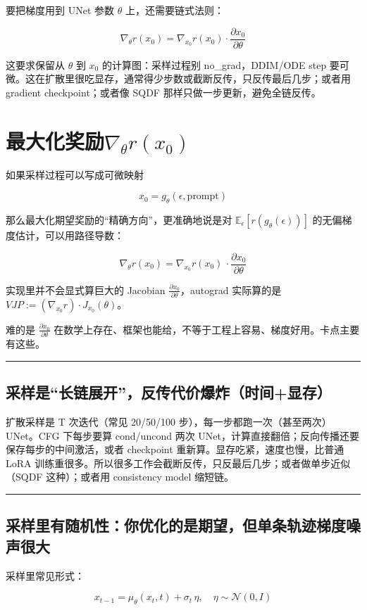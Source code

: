 要把梯度用到 UNet 参数 \(\theta\) 上，还需要链式法则：

\[
\nabla_\theta r(x_0)=\nabla_{x_0} r(x_0)\cdot \frac{\partial x_0}{\partial \theta}
\]

这要求保留从 \(\theta\) 到 \(x_0\) 的计算图：采样过程别 no\_grad，DDIM/ODE step 要可微。这在扩散里很吃显存，通常得少步数或截断反传，只反传最后几步；或者用 gradient checkpoint；或者像 SQDF 那样只做一步更新，避免全链反传。

\section{最大化奖励\(\nabla_\theta r(x_0)\)}

如果采样过程可以写成可微映射

\[
x_0 = g_\theta(\epsilon,\text{prompt})
\]

那么最大化期望奖励的“精确方向”，更准确地说是对 \(\mathbb{E}_\epsilon[r(g_\theta(\epsilon))]\) 的无偏梯度估计，可以用路径导数：

\[
\nabla_\theta r(x_0)=\nabla_{x_0} r(x_0)\,\cdot \frac{\partial x_0}{\partial \theta}
\]

实现里并不会显式算巨大的 Jacobian \(\frac{\partial x_0}{\partial\theta}\)，autograd 实际算的是 \(VJP := (\nabla_{x_0} r)\cdot J_{x_0}(\theta)\)。

难的是 \(\frac{\partial x_0}{\partial \theta}\) 在数学上存在、框架也能给，不等于工程上容易、梯度好用。卡点主要有这些。

\hrule

\subsection{采样是“长链展开”，反传代价爆炸（时间+显存）}

扩散采样是 T 次迭代（常见 20/50/100 步），每一步都跑一次（甚至两次）UNet。CFG 下每步要算 cond/uncond 两次 UNet，计算直接翻倍；反向传播还要保存每步的中间激活，或者 checkpoint 重新算。显存吃紧，速度也慢，比普通 LoRA 训练重很多。所以很多工作会截断反传，只反最后几步；或者做单步近似（SQDF 这种）；或者用 consistency model 缩短链。

\hrule

\subsection{采样里有随机性：你优化的是期望，但单条轨迹梯度噪声很大}

采样里常见形式：

\[
x_{t-1} = \mu_\theta(x_t,t) + \sigma_t\,\eta,\quad \eta\sim \mathcal{N}(0,I)
\]

